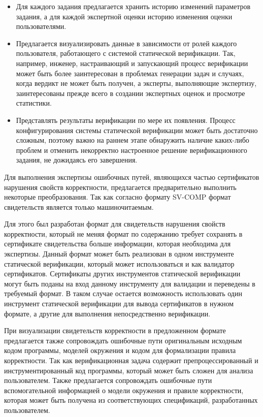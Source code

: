 \documentclass[%
candidate,     %
href,        %
colorlinks,  %
]{disser}
\begin{document}
\begin{itemize}
\item Для каждого задания предлагается хранить историю изменений параметров задания, а для каждой экспертной оценки историю изменения оценки пользователями.
\item Предлагается визуализировать данные в зависимости от ролей каждого пользователя, работающего с системой статической верификации.
Так, например, инженер, настраивающий и запускающий процесс верификации может быть более заинтересован в проблемах генерации задач и случаях, когда вердикт не может быть получен, а эксперты, выполняющие экспертизу, заинтересованы прежде всего в создании экспертных оценок и просмотре статистики.
\item Представлять результаты верификации по мере их появления. 
Процесс конфигурирования системы статической верификации может быть достаточно сложным, поэтому важно на раннем этапе обнаружить наличие каких-либо проблем и отменить некорректно настроенное решение верификационного задания, не дожидаясь его завершения.
\end{itemize}

Для выполнения экспертизы ошибочных путей, являющихся частью сертификатов нарушения свойств корректности, предлагается предварительно выполнить некоторые преобразования.
Так как согласно формату SV-COMP формат свидетельств является только машиночитаемым.

Для этого был разработан формат для свидетельств нарушения свойств корректности, который не меняя формат по содержанию требует сохранять в сертификате свидетельства больше информации, которая необходима для экспертизы.
Данный формат может быть реализован в одном инструменте статической верификации, который может использоваться и как валидатор сертификатов.
Сертификаты других инструментов статической верификации могут быть поданы на вход данному инструменту для валидации и переведены в требуемый формат.
В таком случае остается возможность использовать один инструмент статической верификации для вывода сертификатов в нужном формате, а другие для выполнения непосредственно верификации.

При визуализации свидетельств корректности в предложенном формате предлагается также сопровождать ошибочные пути оригинальным исходным кодом программы, моделей окружения и кодом для формализации правила корректности.
Так как верификационная задача содержит препроцессированный и инструментированный код программы, который может быть сложен для анализа пользователем.
Также предлагается сопровождать ошибочные пути вспомогательной информацией о модели окружения и правиле корректности, которая может быть получена из соответствующих спецификаций, разработанных пользователем.
\end{document}
